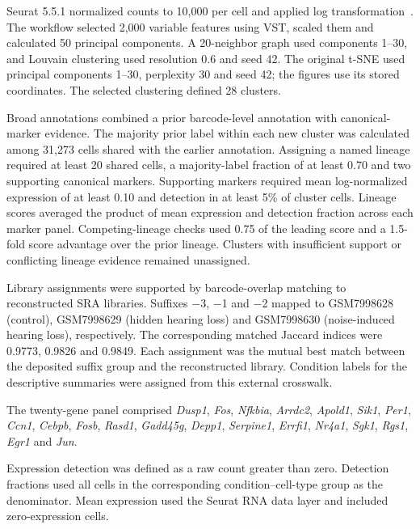 Seurat 5.5.1 normalized counts to 10,000 per cell and applied log transformation~\citep{Hao2024}. The workflow selected 2,000 variable features using VST, scaled them and calculated 50 principal components. A 20-neighbor graph used components 1--30, and Louvain clustering used resolution 0.6 and seed 42. The original t-SNE used principal components 1--30, perplexity 30 and seed 42; the figures use its stored coordinates. The selected clustering defined 28 clusters.

Broad annotations combined a prior barcode-level annotation with canonical-marker evidence. The majority prior label within each new cluster was calculated among 31,273 cells shared with the earlier annotation. Assigning a named lineage required at least 20 shared cells, a majority-label fraction of at least 0.70 and two supporting canonical markers. Supporting markers required mean log-normalized expression of at least 0.10 and detection in at least 5\% of cluster cells. Lineage scores averaged the product of mean expression and detection fraction across each marker panel. Competing-lineage checks used 0.75 of the leading score and a 1.5-fold score advantage over the prior lineage. Clusters with insufficient support or conflicting lineage evidence remained unassigned.

Library assignments were supported by barcode-overlap matching to reconstructed SRA libraries. Suffixes \(-\)3, \(-\)1 and \(-\)2 mapped to GSM7998628 (control), GSM7998629 (hidden hearing loss) and GSM7998630 (noise-induced hearing loss), respectively. The corresponding matched Jaccard indices were 0.9773, 0.9826 and 0.9849. Each assignment was the mutual best match between the deposited suffix group and the reconstructed library. Condition labels for the descriptive summaries were assigned from this external crosswalk.

The twenty-gene panel comprised \mbox{\textit{Dusp1}}, \mbox{\textit{Fos}}, \mbox{\textit{Nfkbia}}, \mbox{\textit{Arrdc2}}, \mbox{\textit{Apold1}}, \mbox{\textit{Sik1}}, \mbox{\textit{Per1}}, \mbox{\textit{Ccn1}}, \mbox{\textit{Cebpb}}, \mbox{\textit{Fosb}}, \mbox{\textit{Rasd1}}, \mbox{\textit{Gadd45g}}, \mbox{\textit{Depp1}}, \mbox{\textit{Serpine1}}, \mbox{\textit{Errfi1}}, \mbox{\textit{Nr4a1}}, \mbox{\textit{Sgk1}}, \mbox{\textit{Rgs1}}, \mbox{\textit{Egr1}} and \mbox{\textit{Jun}}.

Expression detection was defined as a raw count greater than zero. Detection fractions used all cells in the corresponding condition--cell-type group as the denominator. Mean expression used the Seurat RNA data layer and included zero-expression cells.

